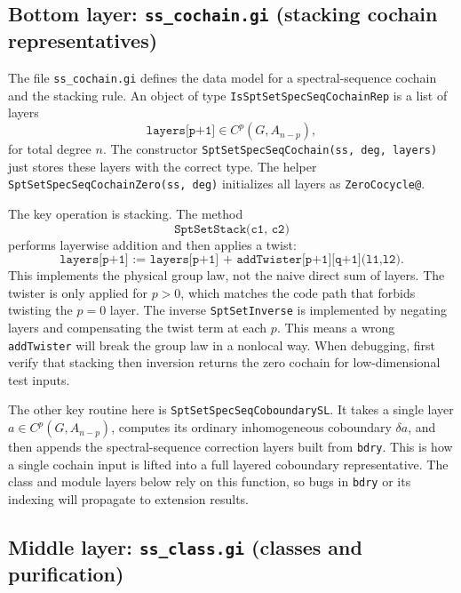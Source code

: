 \documentclass{SciPost}
\begin{document}
\subsection{Bottom layer: \texttt{ss\_cochain.gi} (stacking cochain representatives)}

The file \texttt{ss\_cochain.gi} defines the data model for a spectral-sequence cochain and the stacking rule.
An object of type \texttt{IsSptSetSpecSeqCochainRep} is a list of layers
\begin{equation}
\texttt{layers[p+1]} \in C^p(G, A_{n-p}),
\end{equation}
for total degree $n$.
The constructor \texttt{SptSetSpecSeqCochain(ss, deg, layers)} just stores these layers with the correct type.
The helper \texttt{SptSetSpecSeqCochainZero(ss, deg)} initializes all layers as \texttt{ZeroCocycle@}.

The key operation is stacking.
The method
\begin{equation}
\texttt{SptSetStack(c1, c2)}
\end{equation}
performs layerwise addition and then applies a twist:
\begin{equation}
\texttt{layers[p+1] := layers[p+1] + addTwister[p+1][q+1](l1,l2)}.
\end{equation}
This implements the physical group law, not the naive direct sum of layers.
The twister is only applied for $p>0$, which matches the code path that forbids twisting the $p=0$ layer.
The inverse \texttt{SptSetInverse} is implemented by negating layers and compensating the twist term at each $p$.
This means a wrong \texttt{addTwister} will break the group law in a nonlocal way.
When debugging, first verify that stacking then inversion returns the zero cochain for low-dimensional test inputs.

The other key routine here is \texttt{SptSetSpecSeqCoboundarySL}.
It takes a single layer $a\in C^p(G,A_{n-p})$, computes its ordinary inhomogeneous coboundary $\delta a$, and then appends the spectral-sequence correction layers built from \texttt{bdry}.
This is how a single cochain input is lifted into a full layered coboundary representative.
The class and module layers below rely on this function, so bugs in \texttt{bdry} or its indexing will propagate to extension results.

\subsection{Middle layer: \texttt{ss\_class.gi} (classes and purification)}
\end{document}
